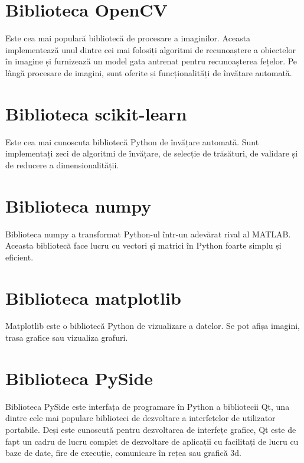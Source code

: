 \section{Biblioteca OpenCV}

Este cea mai populară bibliotecă de procesare a imaginilor. Aceasta implementează unul dintre cei mai folosiți algoritmi de recunoaștere a obiectelor în imagine și furnizează un model gata antrenat pentru recunoașterea fețelor. Pe lângă procesare de imagini, sunt oferite și funcționalități de învățare automată.

\section{Biblioteca scikit-learn}

Este cea mai cunoscuta bibliotecă Python de învățare automată. Sunt implementați zeci de algoritmi de învățare, de selecție de trăsături, de validare și de reducere a dimensionalității.


\section{Biblioteca numpy}

Biblioteca numpy a transformat Python-ul într-un adevărat rival al MATLAB.
Aceasta bibliotecă face lucru cu vectori și matrici în Python foarte simplu și eficient.


\section{Biblioteca matplotlib}

Matplotlib este o bibliotecă Python de vizualizare a datelor. Se pot afișa imagini, trasa grafice sau vizualiza grafuri.

\section{Biblioteca PySide}

Biblioteca PySide este interfața de programare în Python a bibliotecii Qt, una dintre cele mai populare biblioteci de dezvoltare a interfețelor de utilizator portabile. 
Deși este cunoscută pentru dezvoltarea de interfețe grafice, Qt este de fapt un cadru de lucru complet de dezvoltare de aplicații cu facilitați de lucru cu baze de date, fire de execuție, comunicare în rețea sau grafică 3d.
